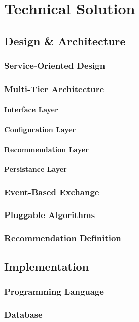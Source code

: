 \chapter{Technical Solution}


\section{Design \& Architecture}

\subsection{Service-Oriented Design}

\subsection{Multi-Tier Architecture}

\subsubsection{Interface Layer}
\subsubsection{Configuration Layer}
\subsubsection{Recommendation Layer}
\subsubsection{Persistance Layer}

\subsection{Event-Based Exchange}

\subsection{Pluggable Algorithms}

\subsection{Recommendation Definition}


\section{Implementation}

\subsection{Programming Language}
\subsection{Database}